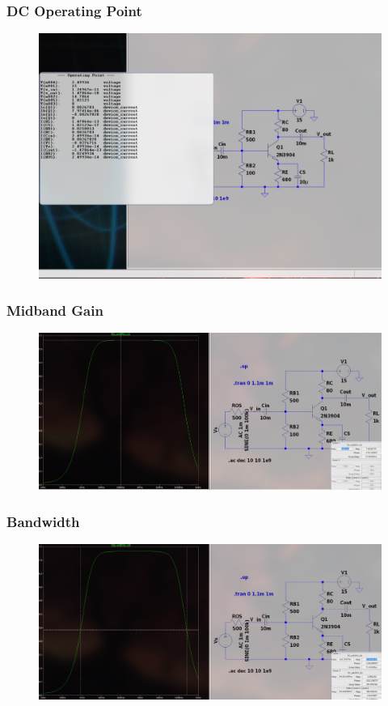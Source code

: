 \documentclass{article}
\begin{document}
\subsubsection{DC Operating Point}
\begin{figure}[h!]
        \centering
        \includegraphics[width=0.7\linewidth]{figs/bjt_ce_op.png}
    \end{figure}
\pagebreak
\subsubsection{Midband Gain}
\begin{figure}[h!]
        \centering
        \includegraphics[width=0.7\linewidth]{figs/bjt_ce_mb.png}
    \end{figure}
\subsubsection{Bandwidth}
\begin{figure}[h!]
        \centering
        \includegraphics[width=0.7\linewidth]{figs/bjt_ce_bw.png}
    \end{figure}
\end{document}
